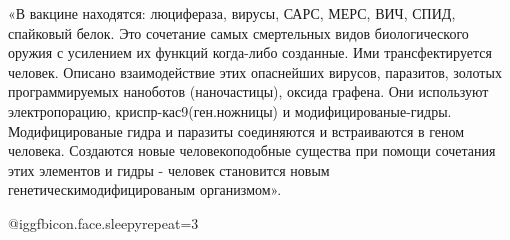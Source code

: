 \begin{itemize}
«В вакцине находятся: люцифераза, вирусы, САРС, МЕРС, ВИЧ, СПИД, спайковый
белок. Это сочетание самых смертельных видов биологического оружия с усилением
их функций когда-либо созданные. Ими трансфектируется человек. Описано
взаимодействие этих опаснейших вирусов, паразитов, золотых программируемых
наноботов (наночастицы), оксида графена. Они используют электропорацию,
криспр-кас9(ген.ножницы) и модифицированые-гидры. Модифицированые гидра и
паразиты соединяются и встраиваются в геном человека. Создаются новые
человекоподобные существа при помощи сочетания этих элементов и гидры - человек
становится новым генетическимодифицированым организмом».

 @igg{fbicon.face.sleepy}{repeat=3} 


\end{itemize} %
